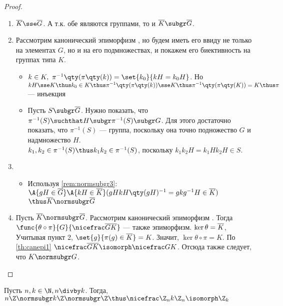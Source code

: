 {\begin{proof}
  \theoremlistshack
  \begin{enumerate}
    \item $\factorgr{K}{}\sse\factorgr{G}{}$. А т.\:к. обе являются группами, то и $\factorgr{K}{}\subgr \factorgr{G}{}$.
    \item Рассмотрим канонический эпиморфизм , но будем иметь его ввиду не только на элементах $G$, но и на его подмножествах, и покажем его биективность на группах типа $K$.
          \begin{itemize}
            \item[\thus]  $k\in K,\ \pi^{-1}\qty(\pi\qty(k))=\set{k_0}{kH=k_0H}$. Но $kH\sse K\thus k_0\in K\thus \pi^{-1}\qty(\pi\qty(k))\sse K\thus \pi^{-1}\qty(\pi\qty(K))=K\thus \pi$ --- инъекция
            \item[\because] Пусть $S\subgr \factorgr{G}{}$. Нужно показать, что $\pi^{-1}(S)\suchthat H\subgr \pi^{-1}(S)\subgr G$. Для этого достаточно показать, что  $\pi^{-1}(S)$ --- группа, поскольку она точно подножество $G$ и надмножество $H$.\\
                  $k_1, k_2\in \pi^{-1}(S)\thus k_1k_2\in \pi^{-1}(S)$, поскольку $k_1k_2H=k_1Hk_2H\in S$.
          \end{itemize}
    \item
          \begin{itemize}
            \item[\thus]  Используя \ref{rem:normsubgr3}: \\
                  $\A{gH\in\factorgr{G}{}}\A{kH\in \factorgr{K}{}}(gHkH\qty(gH)^{-1}=gkg^{-1} H\in\factorgr{K}{})$
                  $\thus \factorgr{K}{}\normsubgr \factorgr{G}{}$
          \end{itemize}
    \item Пусть $\factorgr{K}{}\normsubgr \factorgr{G}{}$. Рассмотрим канонический эпиморфизм . Тогда $\func{\theta\circ\pi }{G}{\ffgr{G}{K}}$ --- также эпиморфизм. $\ker\theta=\factorgr{K}{}$, Учитывая пункт 2, $\set{g}{\pi(g)\in \factorgr{K}{}}=K$. Значит, $\ker\theta\circ\pi=K$. По \ref{th:canepi1} $\ffgr{G}{K}\isomorph\factorgr{G}{K}$. Отсюда также следует, что $K\normsubgr G$.
  \end{enumerate}
\end{proof}
}

\begin{example}
  Пусть $n,k\in \N, n\divby k$. Тогда, $n\Z\normsubgr k\Z\normsubgr\Z\thus \factorgr{\Z_n}{k\Z_n}\isomorph \Z_k$
\end{example}

